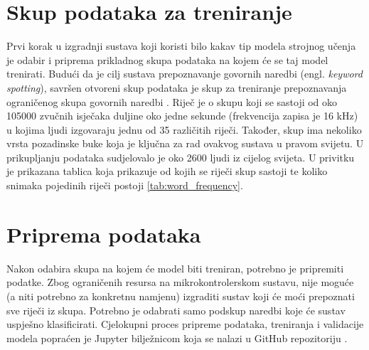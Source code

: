\section{Skup podataka za treniranje}
\label{sec:dataset}

Prvi korak u izgradnji sustava koji koristi bilo kakav tip modela strojnog učenja
je odabir i priprema prikladnog skupa podataka na kojem će se taj model trenirati.
Budući da je cilj sustava prepoznavanje govornih naredbi (engl. \textit{keyword spotting}),
savršen otvoreni skup podataka je skup za treniranje prepoznavanja ograničenog
skupa govornih naredbi \cite{speechcommandsv2}. Riječ je o skupu koji
se sastoji od oko 105000 zvučnih isječaka duljine oko jedne sekunde (frekvencija
zapisa je 16 kHz) u kojima ljudi
izgovaraju jednu od 35 različitih riječi. Također, skup ima nekoliko vrsta 
pozadinske buke koja je ključna za rad ovakvog sustava u pravom svijetu. 
U prikupljanju podataka sudjelovalo je oko 2600 ljudi iz cijelog svijeta.
U privitku je prikazana tablica koja prikazuje od kojih se riječi skup sastoji
te koliko snimaka pojedinih riječi postoji \ref{tab:word_frequency}.


\section{Priprema podataka}
\label{sec:data}

Nakon odabira skupa na kojem će model biti treniran, potrebno je pripremiti
podatke. Zbog ograničenih resursa na mikrokontrolerskom sustavu, nije moguće
(a niti potrebno za konkretnu namjenu) izgraditi sustav koji će moći
prepoznati sve riječi iz skupa. Potrebno je odabrati samo podskup
naredbi koje će sustav uspješno klasificirati. Cjelokupni
proces pripreme podataka, treniranja i validacije modela popraćen je
Jupyter bilježnicom koja se nalazi u GitHub repozitoriju
\cite{balic_keyword_spotting}.

